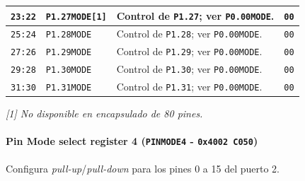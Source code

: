 \begin{longtable}{|>{\raggedright\arraybackslash}p{}|>{\raggedright\arraybackslash}p{}|>{\raggedright\arraybackslash}p{}|>{\centering\arraybackslash}p{}|}
\hline
\texttt{23:22} & \texttt{P1.27MODE[1]} & Control de \texttt{P1.27}; ver \texttt{P0.00MODE}. & \texttt{00} \\
\hline
\texttt{25:24} & \texttt{P1.28MODE} & Control de \texttt{P1.28}; ver \texttt{P0.00MODE}. & \texttt{00} \\
\hline
\texttt{27:26} & \texttt{P1.29MODE} & Control de \texttt{P1.29}; ver \texttt{P0.00MODE}. & \texttt{00} \\
\hline
\texttt{29:28} & \texttt{P1.30MODE} & Control de \texttt{P1.30}; ver \texttt{P0.00MODE}. & \texttt{00} \\
\hline
\texttt{31:30} & \texttt{P1.31MODE} & Control de \texttt{P1.31}; ver \texttt{P0.00MODE}. & \texttt{00} \\
\hline
\end{longtable}
\noindent\textit{[1] No disponible en encapsulado de 80 pines.}

\paragraph{Pin Mode select register 4 (\texttt{PINMODE4} - \texttt{0x4002 C050})}
Configura \textit{pull-up}/\textit{pull-down} para los pines 0 a 15 del puerto 2.

